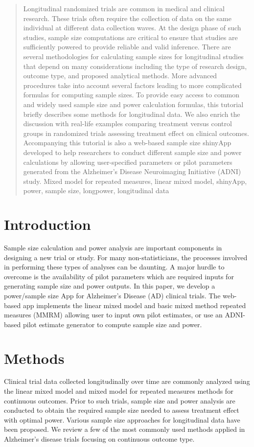 \documentclass[oupdraft]{bio}
\begin{document}
	\begin{abstract}
		{Longitudinal randomized trials are common in medical and clinical research. These trials often require the collection of data on the same individual at different data collection waves. At the design phase of such studies, sample size computations are critical to ensure that studies are sufficiently powered to provide reliable and valid inference. There are several methodologies for calculating sample sizes for longitudinal studies that depend on many considerations including the type of research design, outcome type, and proposed analytical methods. More advanced procedures take into account several factors leading to more complicated formulas for computing sample sizes. To provide easy access to common and widely used sample size and power calculation formulas, this tutorial briefly describes some methods for longitudinal data.  We also enrich the discussion with real-life examples comparing treatment versus control groups in randomized trials assessing treatment effect on clinical outcomes. Accompanying this tutorial is also a web-based sample size shinyApp developed to help researchers to conduct different sample size and power calculations by allowing user-specified parameters or pilot parameters generated from the Alzheimer’s Disease Neuroimaging Initiative (ADNI) study.}
		{Mixed model for repeated measures, linear mixed model, shinyApp, power, sample size, longpower, longitudinal data}
	\end{abstract}
	
	
\section{Introduction}
\label{sec1}
Sample size calculation and power analysis are important components in designing a new trial or study. For many non-statisticians, the processes involved in performing these types of analyses can be daunting. A major hurdle to overcome is the availability of pilot parameters which are required inputs for generating sample size and power outputs. In this paper, we develop a power/sample size App for Alzheimer's Disease (AD) clinical trials. The web-based app  implements the linear mixed model and basic mixed method repeated measures (MMRM) allowing user to input own pilot estimates, or use an ADNI-based pilot estimate generator to compute sample size and power. 


\section{Methods}
\label{sec2}
Clinical trial data collected longitudinally over time are commonly analyzed using the linear mixed model and mixed model for repeated measures methods for continuous outcomes. Prior to such trials, sample size and power analysis are conducted to obtain the required sample size needed to assess treatment effect with optimal power. Various sample size approaches for longitudinal data have been proposed. We review a few of the most commonly used methods applied in Alzheimer's disease trials focusing on continuous outcome type.
\end{document}
